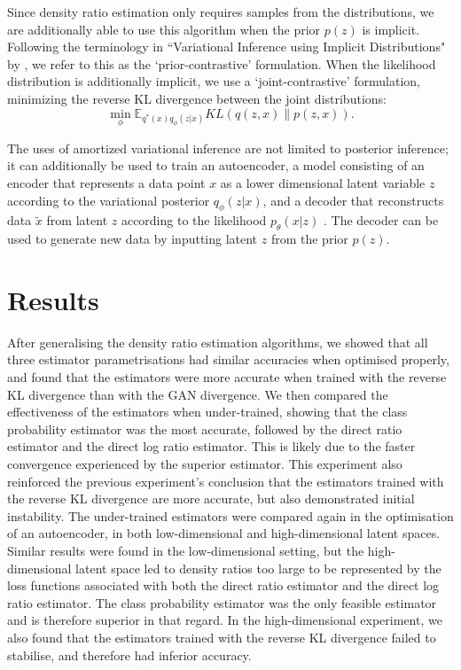\documentclass[honours,12pt]{unswthesis}
\newcommand{\E}{\mathbb{E}}
\numberwithin{equation}{section}
\theoremstyle{definition}
\begin{document}
Since density ratio estimation only requires samples from the distributions, we are additionally able to use this algorithm when the prior $p(z)$ is implicit. Following the terminology in ``Variational Inference using Implicit Distributions" by \citet{huszar}, we refer to this as the `prior-contrastive' formulation. When the likelihood distribution is additionally implicit, we use a `joint-contrastive' formulation, minimizing the reverse KL divergence between the joint distributions:
\[\min_\phi \E_{q^*(x)q_\phi(z|x)}KL(q(z,x)\|p(z,x)).\]

The uses of amortized variational inference are not limited to posterior inference; it can additionally be used to train an autoencoder, a model consisting of an encoder that represents a data point $x$ as a lower dimensional latent variable $z$ according to the variational posterior $q_\phi(z|x)$, and a decoder that reconstructs data $\tilde{x}$ from latent $z$ according to the likelihood $p_\theta(x|z)$ \citep{kingma}. The decoder can be used to generate new data by inputting latent $z$ from the prior $p(z)$.
\section{Results}
After generalising the density ratio estimation algorithms, we showed that all three estimator parametrisations had similar accuracies when optimised properly, and found that the estimators were more accurate when trained with the reverse KL divergence than with the GAN divergence. We then compared the effectiveness of the estimators when under-trained, showing that the class probability estimator was the most accurate, followed by the direct ratio estimator and the direct log ratio estimator. This is likely due to the faster convergence experienced by the superior estimator. This experiment also reinforced the previous experiment's conclusion that the estimators trained with the reverse KL divergence are more accurate, but also demonstrated initial instability. The under-trained estimators were compared again in the optimisation of an autoencoder, in both low-dimensional and high-dimensional latent spaces. Similar results were found in the low-dimensional setting, but the high-dimensional latent space led to density ratios too large to be represented by the loss functions associated with both the direct ratio estimator and the direct log ratio estimator. The class probability estimator was the only feasible estimator and is therefore superior in that regard. In the high-dimensional experiment, we also found that the estimators trained with the reverse KL divergence failed to stabilise, and therefore had inferior accuracy.
\end{document}
